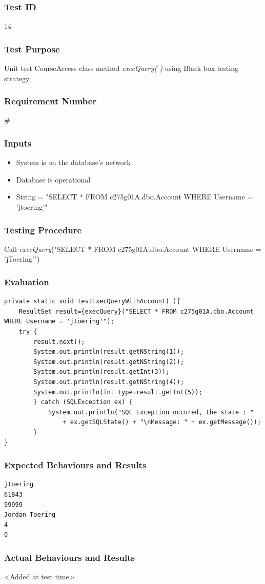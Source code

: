 \documentclass{article}
\begin{document}
\subsubsection{Test ID}
14

\subsubsection{Test Purpose}
Unit test CourseAccess class method \textit{execQuery( )} using Black box testing strategy

\subsubsection{Requirement Number}
\#

\subsubsection{Inputs}
\begin{itemize}
\item System is on the database's network
\item Database is operational
\item String = "SELECT * FROM c275g01A.dbo.Account WHERE Username = 'jtoering'"
\end{itemize}

\subsubsection{Testing Procedure}
Call \textit{execQuery}("SELECT * FROM c275g01A.dbo.Account WHERE Username = 'jToering'")

\subsubsection{Evaluation}
\begin{verbatim}
private static void testExecQueryWithAccount( ){
	ResultSet result={execQuery}("SELECT * FROM c275g01A.dbo.Account WHERE Username = 'jtoering'");
	try {
    	result.next();
	    System.out.println(result.getNString(1));
    	System.out.println(result.getNString(2));
	    System.out.println(result.getInt(3));
	    System.out.println(result.getNString(4));
	    System.out.println(int type=result.getInt(5));
	    } catch (SQLException ex) {
    	    System.out.println("SQL Exception occured, the state : "
                + ex.getSQLState() + "\nMessage: " + ex.getMessage());
        }
}
\end{verbatim}

\subsubsection{Expected Behaviours and Results}
\begin{verbatim}
jtoering
61843
99999
Jordan Toering
4
0
\end{verbatim}

\subsubsection{Actual Behaviours and Results}
<Added at test time>
\end{document}
